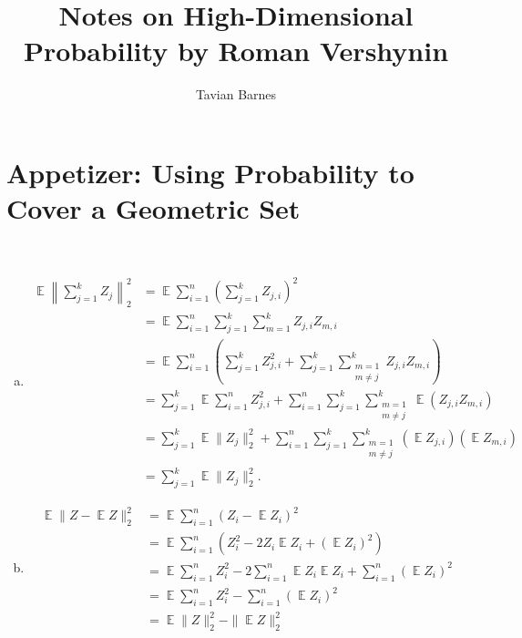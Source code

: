 \documentclass{report}
\title{Notes on High-Dimensional Probability \linebreak[1] by Roman Vershynin}
\author{Tavian Barnes}
\date{}
\theoremstyle{definition}
\newenvironment{exercise}[1]{
  \renewcommand\theexerciseimpl{#1}
  \exerciseimpl
}{\endexerciseimpl}
\DeclareMathOperator{\E}{\mathbb{E}}
\begin{document}
\maketitle

\chapter*{Appetizer: Using Probability to Cover a Geometric Set}

\begin{exercise}{0.0.3}~
  \begin{enumerate}[(a)]
  \item
    \begin{align*}
      \E \left\| \sum_{j=1}^k Z_j \right\|_2^2 & = \E \sum_{i=1}^n \left(\sum_{j=1}^k Z_{j,i}\right)^2 \\
      & = \E \sum_{i=1}^n \sum_{j=1}^k \sum_{m=1}^k Z_{j,i} Z_{m,i} \\
      & = \E \sum_{i=1}^n \left(\sum_{j=1}^k Z_{j,i}^2 + \sum_{j=1}^k \sum_{\substack{m=1 \\ m \ne j}}^k Z_{j,i} Z_{m,i}\right) \\
      & = \sum_{j=1}^k \E \sum_{i=1}^n Z_{j,i}^2 + \sum_{i=1}^n \sum_{j=1}^k \sum_{\substack{m=1 \\ m \ne j}}^k \E (Z_{j,i} Z_{m,i}) \\
      & = \sum_{j=1}^k \E \|Z_j\|_2^2 + \sum_{i=1}^n \sum_{j=1}^k \sum_{\substack{m=1 \\ m \ne j}}^k (\E Z_{j,i}) (\E Z_{m,i}) \tag{by independence} \\
      & = \sum_{j=1}^k \E \|Z_j\|_2^2.
    \end{align*}

  \item
    \begin{align*}
      \E \|Z - \E{Z}\|_2^2 & = \E \sum_{i=1}^n (Z_i - \E{Z_i})^2 \\
      & = \E \sum_{i=1}^n (Z_i^2 - 2 Z_i \E{Z_i} + (\E{Z_i})^2) \\
      & = \E \sum_{i=1}^n Z_i^2 - 2 \sum_{i=1}^n \E Z_i \E{Z_i} + \sum_{i=1}^n (\E Z_i)^2 \\
      & = \E \sum_{i=1}^n Z_i^2 -  \sum_{i=1}^n (\E Z_i)^2 \\
      & = \E \|Z\|_2^2 - \|\E Z\|_2^2
    \end{align*}
  \end{enumerate}
\end{exercise}
\end{document}
